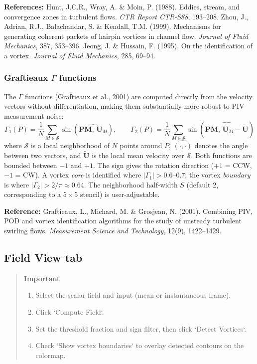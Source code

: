 \noindent\textbf{References:} Hunt, J.C.R., Wray, A. \& Moin, P. (1988). Eddies, stream, and convergence zones in turbulent flows. \textit{CTR Report CTR-S88}, 193--208. Zhou, J., Adrian, R.J., Balachandar, S. \& Kendall, T.M. (1999). Mechanisms for generating coherent packets of hairpin vortices in channel flow. \textit{Journal of Fluid Mechanics}, 387, 353--396. Jeong, J. \& Hussain, F. (1995). On the identification of a vortex. \textit{Journal of Fluid Mechanics}, 285, 69--94.

\subsubsection*{Graftieaux $\Gamma$ functions}

The $\Gamma$ functions (Graftieaux et al., 2001) are computed directly from the velocity vectors without differentiation, making them substantially more robust to PIV measurement noise:
\[
\Gamma_1(P) = \frac{1}{N} \sum_{M \in \mathcal{S}} \sin\!\left(\widehat{\mathbf{PM},\, \mathbf{U}_M}\right), \qquad
\Gamma_2(P) = \frac{1}{N} \sum_{M \in \mathcal{S}} \sin\!\left(\widehat{\mathbf{PM},\, \mathbf{U}_M - \widetilde{\mathbf{U}}}\right)
\]
where $\mathcal{S}$ is a local neighborhood of $N$ points around $P$, $\widehat{(\cdot,\cdot)}$ denotes the angle between two vectors, and $\widetilde{\mathbf{U}}$ is the local mean velocity over $\mathcal{S}$. Both functions are bounded between $-1$ and $+1$. The sign gives the rotation direction ($+1$ = CCW, $-1$ = CW). A vortex \emph{core} is identified where $|\Gamma_1| > 0.6$--$0.7$; the vortex \emph{boundary} is where $|\Gamma_2| > 2/\pi \approx 0.64$. The neighborhood half-width $S$ (default 2, corresponding to a $5 \times 5$ stencil) is user-adjustable.

\noindent\textbf{Reference:} Graftieaux, L., Michard, M. \& Grosjean, N. (2001). Combining PIV, POD and vortex identification algorithms for the study of unsteady turbulent swirling flows. \textit{Measurement Science and Technology}, 12(9), 1422--1429.

\subsection{Field View tab}

\begin{quote}
\textbf{Important}
\begin{enumerate}[leftmargin=1.5em, topsep=2pt]
  \item Select the scalar field and input (mean or instantaneous frame).
  \item Click `Compute Field`.
  \item Set the threshold fraction and sign filter, then click `Detect Vortices`.
  \item Check `Show vortex boundaries` to overlay detected contours on the colormap.
\end{enumerate}
\end{quote}

